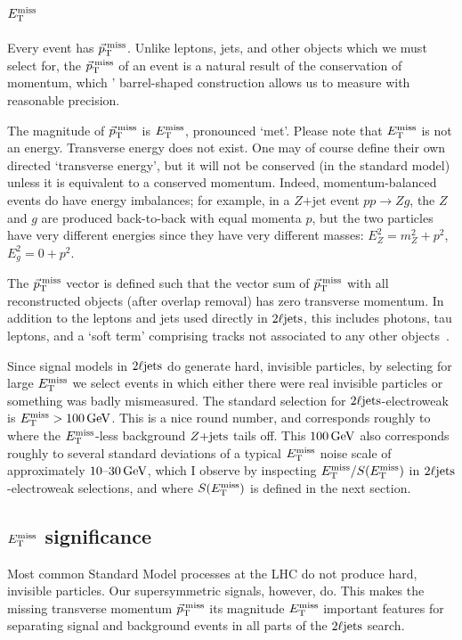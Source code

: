 \subsection{\texorpdfstring{$\met$}{ETmiss}}
Every event has $\ptmiss$.
Unlike leptons, jets, and other objects which we must select for, the $\ptmiss$
of an event is a natural result of the conservation of momentum, which \atlas'
barrel-shaped construction allows us to measure with reasonable precision.

The magnitude of $\ptmiss$ is $\met$, pronounced `met'.
Please note that $\met$ is not an energy.
Transverse energy does not exist.
One may of course define their own directed `transverse energy', but it will
not be conserved (in the standard model) unless it is equivalent to a conserved
momentum.
Indeed, momentum-balanced events do have energy imbalances;
for example, in a $Z\mathrm{+jet}$ event $pp \rightarrow Zg$, the $Z$ and $g$
are produced back-to-back with equal momenta $p$, but the two particles have
very different energies since they have very different masses:
$E_Z^2 = m_Z^2 + p^2$, $E_g^2 = 0 + p^2$.

The $\ptmiss$ vector is defined such that the vector sum of $\ptmiss$ with
all reconstructed objects (after overlap removal) has zero transverse momentum.
In addition to the leptons and jets used directly in $\twoljets$, this includes
photons, tau leptons, and a `soft term' comprising tracks not associated to
any other objects~\cite{atlas_met}.


Since signal models in $\twoljets$ do generate hard, invisible particles,
by selecting for large $\met$ we select events in which either there were real
invisible particles or something was badly mismeasured.
The standard selection for $\twoljets$-electroweak is $\met > 100\,\eV[G]$.
This is a nice round number, and corresponds roughly to where the $\met$-less
background $\zjets$ tails off.
This $100\,\eV[G]$ also corresponds roughly to several standard deviations of
a typical $\met$ noise scale of approximately $10\textrm{--}30\,\eV[G]$, which I observe
by inspecting $\met / \metsig$ in $\twoljets$-electroweak selections,
and where $\metsig$ is defined in the next section.


\subsection{\texorpdfstring{$\met$}{ETmiss} significance}
\label{sec:2ljets_metsig}
Most common Standard Model processes at the LHC do not produce hard,
invisible particles.
Our supersymmetric signals, however, do.
This makes the missing transverse momentum $\ptmiss$ its magnitude $\met$
important features for separating signal and background events in all parts
of the $\twoljets$ search.

